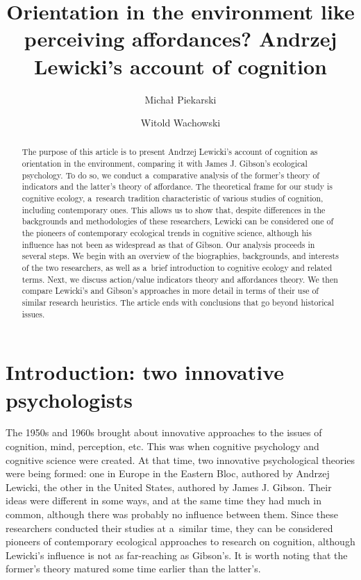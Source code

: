 \documentclass[%
manuscript=article,
year=2024,
volume=77,
doi=00000.000,
]{zfn}
\title[Orientation in the environment like perceiving affordances?\ldots]{Orientation in the environment like perceiving affordances? Andrzej Lewicki's account of cognition}
\author{Michał Piekarski}
\affiliation{Cardinal Stefan Wyszyński University}
\author{Witold Wachowski}
\affiliation{Maria Curie-Skłodowska University in Lublin}
\begin{document}
	
	\begin{abstract}
		The purpose of this article is to present Andrzej Lewicki's account of cognition as orientation in the environment, comparing it with James J. Gibson's ecological psychology. To do so, we conduct a~comparative analysis of the former's theory of indicators and the latter's theory of affordance. The theoretical frame for our study is cognitive ecology, a~research tradition characteristic of various studies of cognition, including contemporary ones. This allows us to show that, despite differences in the backgrounds and methodologies of these researchers, Lewicki can be considered one of the pioneers of contemporary ecological trends in cognitive science, although his influence has not been as widespread as that of Gibson. Our analysis proceeds in several steps. We begin with an overview of the biographies, backgrounds, and interests of the two researchers, as well as a~brief introduction to cognitive ecology and related terms. Next, we discuss action/value indicators theory and affordances theory. We then compare Lewicki's and Gibson's approaches in more detail in terms of their use of similar research heuristics. The article ends with conclusions that go beyond historical issues.
	\end{abstract}
	
	











\section{Introduction: two innovative psychologists}

The 1950s and 1960s brought about innovative approaches to the issues of cognition, mind, perception, etc. This was when cognitive psychology and cognitive science were created. At that time, two innovative psychological theories were being formed: one in Europe in the Eastern Bloc, authored by Andrzej Lewicki, the other in the United States, authored by James J. Gibson. Their ideas were different in some ways, and at the same time they had much in common, although there was probably no influence between them. Since these researchers conducted their studies at a~similar time, they can be considered pioneers of contemporary ecological approaches to research on cognition, although Lewicki's influence is not as far-reaching as Gibson's. It is worth noting that the former's theory matured some time earlier than the latter's.
\end{document}
